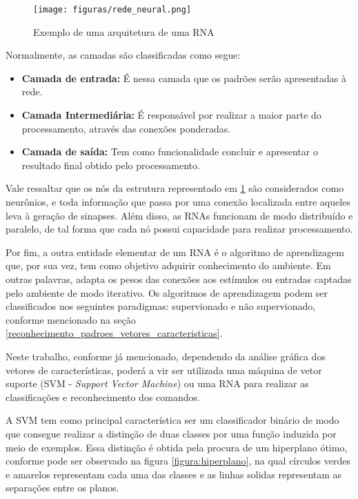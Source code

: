 \documentclass[a4paper,12pt,twoside,openright]{report}
\begin{document}
\begin{figure}[H]
	\centering
	\texttt{[image: figuras/rede\_neural.png]}
	\caption{Exemplo de uma arquitetura de uma RNA}
	\label{figura:rede}
\end{figure}

\par Normalmente, as camadas s\~{a}o classificadas como segue:
\begin{itemize}
	\item {} \textbf{Camada de entrada:} \'{E} nessa camada que os padr\~{o}es ser\~{a}o apresentadas \`{a} rede.
	\item {} \textbf{Camada Intermedi\'{a}ria:} \'{E} respons\'{a}vel por realizar a maior parte do processamento, atrav\'{e}s das conex\~{o}es ponderadas.
	\item {} \textbf{Camada de sa\'{i}da:} Tem como funcionalidade concluir e apresentar o resultado final obtido pelo processamento. 
\end{itemize}

\par Vale ressaltar que os n\'{o}s da estrutura representado em \ref{figura:rede} s\~{a}o considerados como neur\^{o}nios, e toda informa{\c c}\~{a}o que passa por uma conex\~{a}o localizada entre aqueles leva \`{a} gera{\c c}\~{a}o de sinapses. Al\'{e}m disso, as RNAs funcionam de modo distribu\'{i}do e paralelo, de tal forma que cada n\'{o} possui capacidade para realizar processamento.

\par Por fim, a outra entidade elementar de um RNA \'{e} o algoritmo de aprendizagem que, por sua vez, tem como objetivo adquirir conhecimento do ambiente. Em outras palavras, adapta os pesos das conex\~{o}es aos est\'{i}mulos ou entradas captadas pelo ambiente de modo iterativo.  Os algoritmos de aprendizagem podem ser classificados nos seguintes paradigmas: supervionado e n\~{a}o supervionado, conforme mencionado na se{\c c}\~{a}o \ref{reconhecimento_padroes_vetores_caracteristicas}.

\par Neste trabalho, conforme j\'{a} mencionado, dependendo da an\'{a}lise gr\'{a}fica dos vetores de caracter\'{i}sticas, poder\'{a} a vir ser utilizada uma m\'{a}quina de vetor suporte (SVM - \textit{Support Vector Machine}) ou uma RNA para realizar as classifica{\c c}\~{o}es e reconhecimento dos comandos.
\par A SVM tem como principal caracter\'{i}stica ser um classificador bin\'{ario} de modo que consegue realizar a distin{\c c}\~{a}o de duas classes por uma fun{\c c}\~{a}o induzida por meio de exemplos. Essa distin{\c c}\~{a}o \'{e} obtida pela procura de um hiperplano \'{o}timo, conforme pode ser observado na figura \ref{figura:hiperplano}, na qual c\'{i}rculos verdes e amarelos representam cada uma das classes e as linhas solidas representam as separa{\c c}\~{o}es entre os planos.
\end{document}
